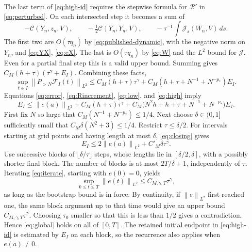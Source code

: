 \documentclass[11pt]{article}
\theoremstyle{remark}\newtheorem{remark}[theorem]{Remark}
\newcommand{\cR}{\mathcal R}
\newcommand{\cC}{\mathcal C}
\newcommand{\cJ}{\mathcal J}
\newcommand{\norm}[2][]{\left\lVert #2\right\rVert_{#1}}
\begin{document}
The last term of \eqref{eq:high-id} requires the stepwise formula for
$\cR'$ in \eqref{eq:perturbed}.
On each intersected step it becomes a sum of
\[
-\cC(Y_n,z_n,V),\qquad-\tfrac12\cC(Y_n,Y_n,V),\qquad
-\tau^{-1}\int\cJ_s(W_n,V)\,ds.
\]
The first two are $O(\tau q_n)$ by \eqref{eq:published-dynamic}, with the
negative norm on $Y_n$, and \eqref{eq:YX}, \eqref{eq:eX}. The last is
$O(\tau q_n)$ by \eqref{eq:W} and the $L^2$ bound for $\cJ$.
Even for a partial final step this is a valid upper bound. Summing gives
$C_M(h+\tau)(\tau^\gamma+E_I)$.
Combining these facts,
\begin{equation}\label{eq:high}
\sup_{t\in I}\norm[L^2]{P_{>N}\mathcal F_I(t)}
\leq C_M(h+\tau)\tau^\gamma
+C_M(h+\tau+N^{-1}+N^{-p_*})E_I.
\end{equation}
Equations \eqref{eq:error}, \eqref{eq:Rincrement}, \eqref{eq:low}, and
\eqref{eq:high} imply
\begin{equation}\label{eq:closing}
E_I\leq\norm[L^2]{e(a)}+C_M(h+\tau)\tau^\gamma
+C_M\bigl(N^2h+h+\tau+N^{-1}+N^{-p_*}\bigr)E_I.
\end{equation}
First fix $N$ so large that $C_M(N^{-1}+N^{-p_*})\leq1/4$.
Next choose $\delta\in(0,1]$ sufficiently small that
$C_M\delta(N^2+3)\leq1/4$. Restrict $\tau\leq\delta/2$.
For intervals starting at grid points and having length at most $\delta$,
\eqref{eq:closing} gives
\begin{equation}\label{eq:iterate}
E_I\leq2\norm[L^2]{e(a)}+C'_M\delta\tau^\gamma.
\end{equation}
Use successive blocks of $\lfloor\delta/\tau\rfloor$ steps, whose lengths lie
in $[\delta/2,\delta]$, with a possibly shorter final block.
The number of blocks is at most $2T/\delta+1$, independently of $\tau$.
Iterating \eqref{eq:iterate}, starting with $e(0)=0$, yields
\begin{equation}\label{eq:global}
\sup_{0\leq t\leq T}\norm[L^2]{e(t)}\leq C_{M,\gamma,T}\tau^\gamma,
\end{equation}
as long as the bootstrap bound is in force.
By continuity, if $\norm[L^2]{e}$ first reached one, the same block argument
up to that time would give an upper bound $C_{M,\gamma,T}\tau^\gamma$.
Choosing $\tau_0$ smaller so that this is less than $1/2$ gives a contradiction.
Hence \eqref{eq:global} holds on all of $[0,T]$.
The retained initial endpoint in \eqref{eq:high-id} is estimated by
$E_I$ on each block, so the recurrence also applies when $e(a)\ne0$.
\end{document}
